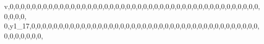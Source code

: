 \documentclass[]{article}
\newenvironment{Shaded}{\begin{snugshade}}{\end{snugshade}}
\newcommand{\DecValTok}[1]{\textcolor[rgb]{0.00,0.00,0.81}{#1}}
\newcommand{\NormalTok}[1]{#1}
\begin{document}
\begin{Shaded}
\begin{Highlighting}[]
\NormalTok{v,}\DecValTok{0}\NormalTok{,}\DecValTok{0}\NormalTok{,}\DecValTok{0}\NormalTok{,}\DecValTok{0}\NormalTok{,}\DecValTok{0}\NormalTok{,}\DecValTok{0}\NormalTok{,}\DecValTok{0}\NormalTok{,}\DecValTok{0}\NormalTok{,}\DecValTok{0}\NormalTok{,}\DecValTok{0}\NormalTok{,}\DecValTok{0}\NormalTok{,}\DecValTok{0}\NormalTok{,}\DecValTok{0}\NormalTok{,}\DecValTok{0}\NormalTok{,}\DecValTok{0}\NormalTok{,}\DecValTok{0}\NormalTok{,}\DecValTok{0}\NormalTok{,}\DecValTok{0}\NormalTok{,}\DecValTok{0}\NormalTok{,}\DecValTok{0}\NormalTok{,}\DecValTok{0}\NormalTok{,}\DecValTok{0}\NormalTok{,}\DecValTok{0}\NormalTok{,}\DecValTok{0}\NormalTok{,}\DecValTok{0}\NormalTok{,}\DecValTok{0}\NormalTok{,}\DecValTok{0}\NormalTok{,}\DecValTok{0}\NormalTok{,}\DecValTok{0}\NormalTok{,}\DecValTok{0}\NormalTok{,}\DecValTok{0}\NormalTok{,}\DecValTok{0}\NormalTok{,}\DecValTok{0}\NormalTok{,}\DecValTok{0}\NormalTok{,}\DecValTok{0}\NormalTok{,}\DecValTok{0}\NormalTok{,}\DecValTok{0}\NormalTok{,}\DecValTok{0}\NormalTok{,}\DecValTok{0}\NormalTok{,}\DecValTok{0}\NormalTok{,}\DecValTok{0}\NormalTok{,}\DecValTok{0}\NormalTok{,}\DecValTok{0}\NormalTok{,}\DecValTok{0}\NormalTok{,}\DecValTok{0}\NormalTok{,}\DecValTok{0}\NormalTok{,}\DecValTok{0}\NormalTok{,}\DecValTok{0}\NormalTok{,}\DecValTok{0}\NormalTok{,}
\DecValTok{0}\NormalTok{,y1_}\DecValTok{17}\NormalTok{,}\DecValTok{0}\NormalTok{,}\DecValTok{0}\NormalTok{,}\DecValTok{0}\NormalTok{,}\DecValTok{0}\NormalTok{,}\DecValTok{0}\NormalTok{,}\DecValTok{0}\NormalTok{,}\DecValTok{0}\NormalTok{,}\DecValTok{0}\NormalTok{,}\DecValTok{0}\NormalTok{,}\DecValTok{0}\NormalTok{,}\DecValTok{0}\NormalTok{,}\DecValTok{0}\NormalTok{,}\DecValTok{0}\NormalTok{,}\DecValTok{0}\NormalTok{,}\DecValTok{0}\NormalTok{,}\DecValTok{0}\NormalTok{,}\DecValTok{0}\NormalTok{,}\DecValTok{0}\NormalTok{,}\DecValTok{0}\NormalTok{,}\DecValTok{0}\NormalTok{,}\DecValTok{0}\NormalTok{,}\DecValTok{0}\NormalTok{,}\DecValTok{0}\NormalTok{,}\DecValTok{0}\NormalTok{,}\DecValTok{0}\NormalTok{,}\DecValTok{0}\NormalTok{,}\DecValTok{0}\NormalTok{,}\DecValTok{0}\NormalTok{,}\DecValTok{0}\NormalTok{,}\DecValTok{0}\NormalTok{,}\DecValTok{0}\NormalTok{,}\DecValTok{0}\NormalTok{,}\DecValTok{0}\NormalTok{,}\DecValTok{0}\NormalTok{,}\DecValTok{0}\NormalTok{,}\DecValTok{0}\NormalTok{,}\DecValTok{0}\NormalTok{,}\DecValTok{0}\NormalTok{,}\DecValTok{0}\NormalTok{,}\DecValTok{0}\NormalTok{,}\DecValTok{0}\NormalTok{,}\DecValTok{0}\NormalTok{,}\DecValTok{0}\NormalTok{,}\DecValTok{0}\NormalTok{,}\DecValTok{0}\NormalTok{,}\DecValTok{0}\NormalTok{,}\DecValTok{0}\NormalTok{,}\DecValTok{0}\NormalTok{,}

\end{Highlighting}
\end{Shaded}
\end{document}
